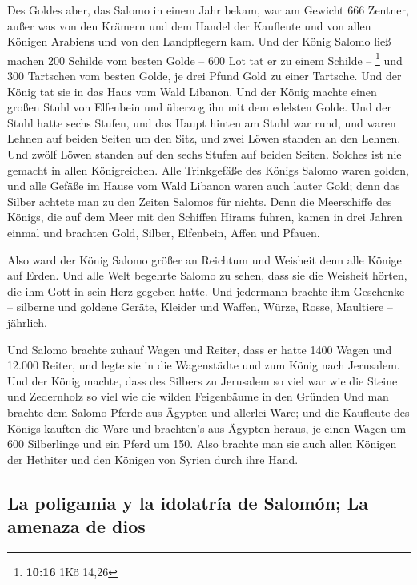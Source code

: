  Des Goldes aber, das Salomo in einem Jahr bekam, war am
Gewicht 666 Zentner,  außer was von den Krämern und dem
Handel der Kaufleute und von allen Königen Arabiens und von den
Landpflegern kam.  Und der König Salomo ließ machen 200
Schilde vom besten Golde -- 600 Lot tat er zu einem Schilde --
\footnote{\textbf{10:16} 1Kö 14,26}  und 300 Tartschen
vom besten Golde, je drei Pfund Gold zu einer Tartsche. Und der König
tat sie in das Haus vom Wald Libanon.  Und der König
machte einen großen Stuhl von Elfenbein und überzog ihn mit dem edelsten
Golde.  Und der Stuhl hatte sechs Stufen, und das Haupt
hinten am Stuhl war rund, und waren Lehnen auf beiden Seiten um den
Sitz, und zwei Löwen standen an den Lehnen.  Und zwölf
Löwen standen auf den sechs Stufen auf beiden Seiten. Solches ist nie
gemacht in allen Königreichen.  Alle Trinkgefäße des
Königs Salomo waren golden, und alle Gefäße im Hause vom Wald Libanon
waren auch lauter Gold; denn das Silber achtete man zu den Zeiten
Salomos für nichts.  Denn die Meerschiffe des Königs, die
auf dem Meer mit den Schiffen Hirams fuhren, kamen in drei Jahren einmal
und brachten Gold, Silber, Elfenbein, Affen und Pfauen.

 Also ward der König Salomo größer an Reichtum und
Weisheit denn alle Könige auf Erden.  Und alle Welt
begehrte Salomo zu sehen, dass sie die Weisheit hörten, die ihm Gott in
sein Herz gegeben hatte.  Und jedermann brachte ihm
Geschenke -- silberne und goldene Geräte, Kleider und Waffen, Würze,
Rosse, Maultiere -- jährlich.

 Und Salomo brachte zuhauf Wagen und Reiter, dass er
hatte 1400 Wagen und 12.000 Reiter, und legte sie in die Wagenstädte und
zum König nach Jerusalem.  Und der König machte, dass des
Silbers zu Jerusalem so viel war wie die Steine und Zedernholz so viel
wie die wilden Feigenbäume in den Gründen  Und man
brachte dem Salomo Pferde aus Ägypten und allerlei Ware; und die
Kaufleute des Königs kauften die Ware  und brachten's aus
Ägypten heraus, je einen Wagen um 600 Silberlinge und ein Pferd um 150.
Also brachte man sie auch allen Königen der Hethiter und den Königen von
Syrien durch ihre Hand.

\hypertarget{la-poligamia-y-la-idolatruxeda-de-salomuxf3n-la-amenaza-de-dios}{%
\subsection{La poligamia y la idolatría de Salomón; La amenaza de
dios}\label{la-poligamia-y-la-idolatruxeda-de-salomuxf3n-la-amenaza-de-dios}}

